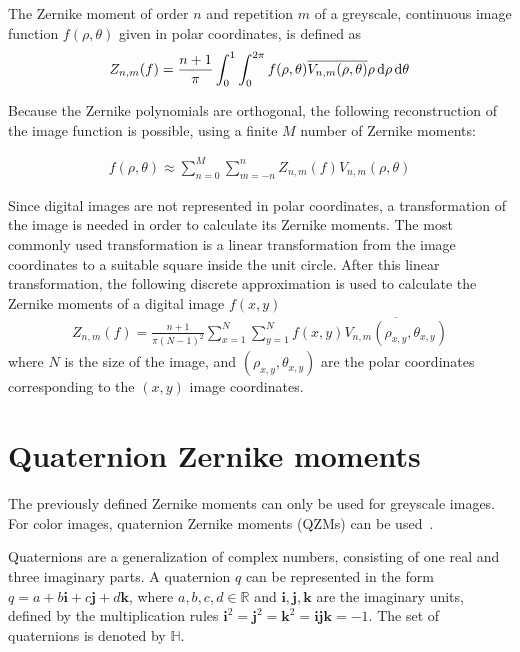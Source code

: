 The Zernike moment of order $n$ and repetition $m$ of a greyscale, continuous image function $f(\rho,\theta)$ given in polar coordinates, is defined as
\begin{gather*}
  Z_{n,m}(f) = \frac{n + 1}{\pi}\int_0^1\int_0^{2\pi}f(\rho,\theta)\overline{V_{n,m}(\rho,\theta)}\rho\dif\rho\dif\theta
\end{gather*}

Because the Zernike polynomials are orthogonal, the following reconstruction of the image function is possible, using a finite $M$ number of Zernike moments:

\begin{gather*}
  f(\rho,\theta) \approx \sum_{n=0}^{M}\sum_{m=-n}^{n}Z_{n,m}(f)V_{n,m}(\rho,\theta)
\end{gather*}

Since digital images are not represented in polar coordinates, a transformation of the image is needed in order to calculate its Zernike moments. The most commonly used transformation is a linear transformation from the image coordinates to a suitable square inside the unit circle. %
After this linear transformation, the following discrete approximation is used to calculate the Zernike moments of a digital image $f(x,y)$
\begin{gather*}
  Z_{n,m}(f) = \frac{n+1}{\pi(N-1)^2}\sum_{x=1}^{N}\sum_{y=1}^{N}f(x,y)\overline{V_{n,m}(\rho_{x,y},\theta_{x,y})}
\end{gather*}
where $N$ is the size of the image, and $(\rho_{x,y},\theta_{x,y})$ are the polar coordinates corresponding to the $(x,y)$ image coordinates.

\section{Quaternion Zernike moments}
The previously defined Zernike moments can only be used for greyscale images. For color images, quaternion Zernike moments (QZMs) can be used~\cite{qzm}.

Quaternions are a generalization of complex numbers, consisting of one real and three imaginary parts. A quaternion $q$ can be represented in the form $q = a + b\mathbf{i} + c\mathbf{j} + d\mathbf{k}$, where $a,b,c,d \in \mathds{R}$ and $\mathbf{i}, \mathbf{j}, \mathbf{k}$ are the imaginary units, defined by the multiplication rules $\mathbf{i}^2 = \mathbf{j}^2 = \mathbf{k}^2 = \mathbf{ijk} = -1$. The set of quaternions is denoted by $\mathds{H}$.

